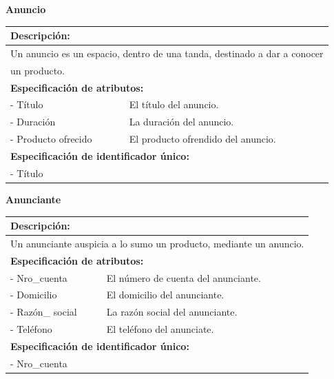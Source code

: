 \documentclass[a4paper,10pt]{article}
\begin{document}
    \begin{flushleft}
      \begin{large} \bf{Anuncio} \end{large}
    \end{flushleft}
      \begin{tabular}{| p{2cm} | p{9cm} |}
	\hline
	\multicolumn{2}{|l|}{\bf{Descripci\'on:}} \\
	\hline
	\multicolumn{2}{|l|}{Un anuncio es un espacio, dentro de una tanda, destinado a dar a conocer} \\
	\multicolumn{2}{|l|}{un producto.} \\
	\hline	
	\hline	
	\multicolumn{2}{|l|}{\bf{Especificaci\'on de atributos:}} \\
	\hline
	- T\'itulo & El t\'itulo del anuncio. \\
	\hline \hline
	- Duraci\'on & La duraci\'on del anuncio. \\
	\hline \hline
	- Producto \newline ofrecido & El producto ofrendido del anuncio. \\
	\hline
	\multicolumn{2}{|l|}{\bf{Especificaci\'on de identificador \'unico:}} \\
	\hline
	\multicolumn{2}{|l|}{- T\'itulo} \\
	\hline
      \end{tabular}

    \newpage
    \begin{flushleft}
      \begin{large} \bf{Anunciante} \end{large}
    \end{flushleft}
      \begin{tabular}{| p{2cm} | p{9cm} |}
	\hline
	\multicolumn{2}{|l|}{\bf{Descripci\'on:}} \\
	\hline
	\multicolumn{2}{|l|}{Un anunciante auspicia a lo sumo un producto, mediante un anuncio.} \\
	\hline	
	\multicolumn{2}{|l|}{\bf{Especificaci\'on de atributos:}} \\
	\hline
	- Nro\_cuenta & El n\'umero de cuenta del anunciante. \\
	\hline \hline
	- Domicilio & El domicilio del anunciante. \\
	\hline \hline
	- Raz\'on\_ \newline social & La raz\'on social del anunciante. \\
	\hline \hline
	- Tel\'efono & El tel\'efono del anunciate. \\
	\hline
	\multicolumn{2}{|l|}{\bf{Especificaci\'on de identificador \'unico:}} \\
	\hline
	\multicolumn{2}{|l|}{- Nro\_cuenta} \\
	\hline
      \end{tabular}
\end{document}
